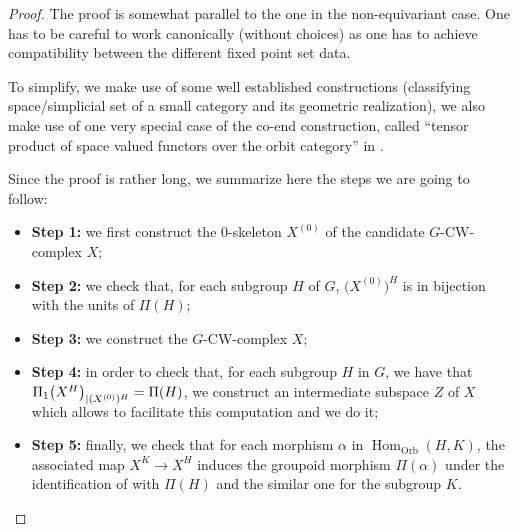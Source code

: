 \documentclass[pdftex]{sigma}
\numberwithin{equation}{section}
\DeclareMathOperator{\Hom}{Hom} %
\DeclareMathOperator{\Orb}{Orb}
\begin{document}
	\begin{proof}
		The proof is somewhat parallel to the one in the non-equivariant
		case. One has to be careful to work canonically (without choices) as one has
		to achieve compatibility between the different fixed point set data.
		
		To simplify, we make use of some well established constructions (classifying
		space/simplicial set of a small category and its geometric realization), we
		also make use of one very special case of the co-end construction, called
		``tensor product of space valued functors over the orbit category'' in
		\cite[Section~1]{DavisLueck}.
		
		Since the proof is rather long, we summarize here the steps we are going to follow:
		\begin{itemize}\itemsep=0pt
			\item\textbf{Step 1:} we first construct the 0-skeleton $X^{(0)}$ of the candidate $G$-CW-complex $X$;
			\item \textbf{Step 2:} we check that, for each subgroup $H$ of $G$, $\bigl(X^{(0)}\bigr)^{H}$ is in bijection with the units of $\Pi(H)$;
			\item \textbf{Step 3:} we construct the $G$-CW-complex $X$;
			\item \textbf{Step 4:} in order to check that, for each subgroup $H$ in $G$, we have that $\smash{\Pi_1\bigl(X^H\bigr)_{|(X^{(0)})^H}}= \Pi(H)$, we construct an intermediate subspace $Z$ of $X$ which allows to facilitate this computation and we do it;
			\item \textbf{Step 5:} finally, we check that for each morphism $\alpha$ in $\Hom_{\Orb}(H,K)$, the associated map $X^K\to X^H$ induces the groupoid morphism $\Pi(\alpha)$ under the identification of  with $\Pi(H)$ and the similar one for the subgroup $K$.
		\end{itemize}
		

\end{proof}
\end{document}
